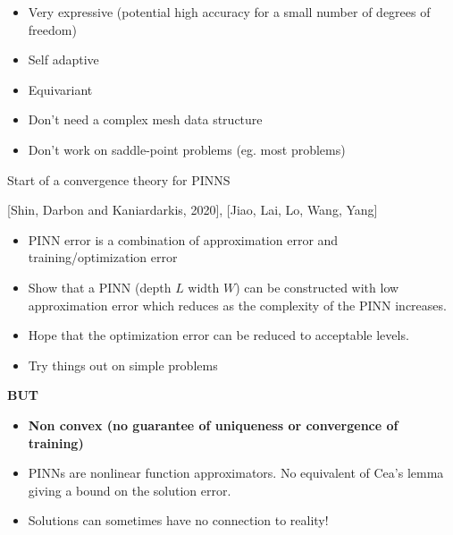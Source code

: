 \documentclass{beamer}
\begin{document}
\begin{frame}


\begin{itemize}

\item Very expressive (potential high accuracy for a small number of degrees of freedom)
\item Self adaptive
\item Equivariant
\item Don't need a complex mesh data structure
\item Don't work on saddle-point problems (eg. most problems)
\end{itemize}

\end{frame}

\begin{frame}{Start of a convergence theory for PINNS}


[Shin, Darbon and Kaniardarkis, 2020], [Jiao, Lai, Lo, Wang, Yang]

\begin{itemize}
\item PINN error is a combination of approximation error and training/optimization error
\item Show that a PINN (depth $L$ width $W$) can be constructed with low approximation error which reduces as the complexity of the PINN increases. 
\item Hope that the optimization error can be reduced to acceptable levels. 
\item Try things out on simple problems
\end{itemize}

\end{frame}

\begin{frame}

{\bf BUT} 

\begin{itemize}
\item {\bf Non convex (no guarantee of uniqueness or convergence of training)}
\item PINNs are nonlinear function approximators. {\color{red} No equivalent of Cea's lemma giving a bound on the solution error.}
\item Solutions can sometimes have no connection to reality!
\end{itemize}



\end{frame}
\end{document}
